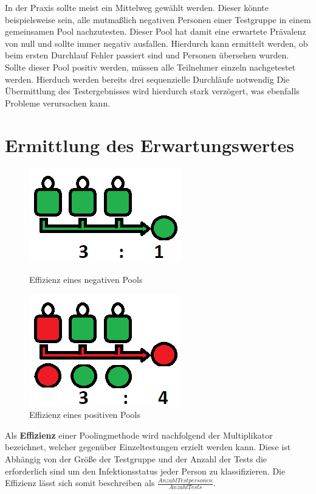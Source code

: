 In der Praxis sollte meist ein Mittelweg gewählt werden.
Dieser könnte beispielsweise sein, alle mutmaßlich negativen Personen einer Testgruppe in einem gemeinsamen Pool nachzutesten.
Dieser Pool hat damit eine erwartete Prävalenz von null und sollte immer negativ ausfallen.
Hierdurch kann ermittelt werden, ob beim ersten Durchlauf Fehler passiert sind und Personen übersehen wurden.
Sollte dieser Pool positiv werden, müssen alle Teilnehmer einzeln nachgetestet werden.
Hierduch werden bereits drei sequenzielle Durchläufe notwendig
Die Übermittlung des Testergebnisses wird hierdurch stark verzögert, was ebenfalls Probleme verursachen kann.

\section{Ermittlung des Erwartungswertes}
\begin{figure}
	\includegraphics[width=.4\textwidth]{img/EffizienzNegativ}
	\caption{Effizienz eines \newline negativen Pools}
	
	\includegraphics[width=.4\textwidth]{img/EffizienzPositiv}
	\caption{Effizienz eines \newline positiven Pools}
\end{figure}

Als \textbf{Effizienz} einer Poolingmethode wird nachfolgend der Multiplikator bezeichnet, welcher gegenüber Einzeltestungen erzielt werden kann.
Diese ist Abhängig von der Größe der Testgruppe und der Anzahl der Tests die erforderlich sind um den Infektionsstatus jeder Person zu klassifizieren.
Die Effizienz lässt sich somit beschreiben als $\frac{Anzahl Testpersonen}{Anzahl Tests} $.

